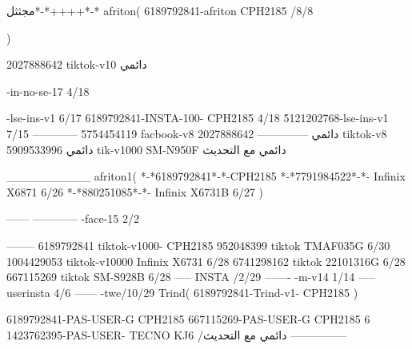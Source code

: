 مجثثل*-*++++*-*
afriton(
6189792841-afriton CPH2185  /8/8

)

2027888642 tiktok-v10
دائمي

-in-no-se-17 4/18

-lse-ins-v1 6/17
6189792841-INSTA-100- CPH2185 4/18
5121202768-lse-ins-v1 7/15
------------
5754454119 facbook-v8
دائمي
--------------
2027888642 tiktok-v8
دائمي
5909533996 tik-v1000  SM-N950F
دائمي مع التحديث

__________
afriton1(
*-*6189792841*-*-CPH2185
*-*7791984522*-*- Infinix X6871  6/26
*-*880251085*-*-  Infinix X6731B  6/27
)


------
------------
-face-15 2/2

--------
6189792841 tiktok-v1000- CPH2185 
952048399 tiktok TMAF035G  6/30
1004429053 tiktok-v10000 Infinix X6731  6/28
6741298162 tiktok 22101316G  6/28
667115269 tiktok SM-S928B  6/28
-----
 INSTA /2/29
-------
-m-v14 1/14
-----
userinsta 4/6
------
-twe/10/29
Trind(
6189792841-Trind-v1- CPH2185 
)


6189792841-PAS-USER-G CPH2185 
667115269-PAS-USER-G CPH2185 6
1423762395-PAS-USER- TECNO KJ6  /دائمي مع التحديث
    ---------------
